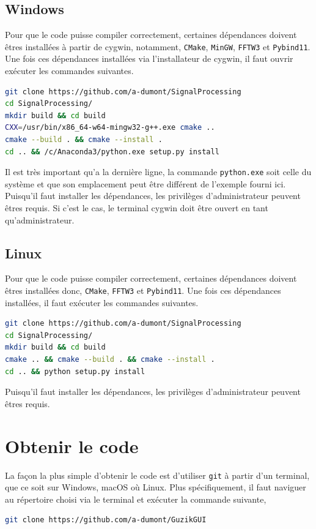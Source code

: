 \documentclass[openright,letterpaper,12pt]{book}
\begin{document}
\subsection*{Windows}
Pour que le code puisse compiler correctement, certaines dépendances doivent 
êtres installées à partir de cygwin, notamment, \verb+CMake+, \verb+MinGW+, 
\verb+FFTW3+ et \verb+Pybind11+. 
Une fois ces dépendances installées via l'installateur de cygwin, il faut 
ouvrir
exécuter les commandes suivantes.
\begin{lstlisting}[language=Bash]
git clone https://github.com/a-dumont/SignalProcessing
cd SignalProcessing/
mkdir build && cd build
CXX=/usr/bin/x86_64-w64-mingw32-g++.exe cmake .. 
cmake --build . && cmake --install .
cd .. && /c/Anaconda3/python.exe setup.py install
\end{lstlisting}
Il est très important qu'a la dernière ligne, la commande \verb+python.exe+ 
soit celle du système et que son emplacement peut être différent de l'exemple 
fourni ici.
Puisqu'il faut installer les dépendances, les privilèges d'administrateur 
peuvent êtres requis. 
Si c'est le cas, le terminal cygwin doit être ouvert en tant qu'administrateur.

\subsection*{Linux}
Pour que le code puisse compiler correctement, certaines dépendances doivent 
êtres installées donc, \verb+CMake+, \verb+FFTW3+ et \verb+Pybind11+. 
Une fois ces dépendances installées, il faut 
exécuter les commandes suivantes.
\begin{lstlisting}[language=Bash]
git clone https://github.com/a-dumont/SignalProcessing
cd SignalProcessing/
mkdir build && cd build
cmake .. && cmake --build . && cmake --install .
cd .. && python setup.py install
\end{lstlisting}
Puisqu'il faut installer les dépendances, les privilèges d'administrateur 
peuvent êtres requis. 

\section*{Obtenir le code}
La façon la plus simple d'obtenir le code est d'utiliser \verb+git+ à partir 
d'un terminal, que ce soit sur Windows, macOS où Linux. 
Plus spécifiquement, il faut naviguer au répertoire choisi via le terminal et 
exécuter la commande suivante,

\begin{lstlisting}[language=Bash]
git clone https://github.com/a-dumont/GuzikGUI
\end{lstlisting}
\end{document}

